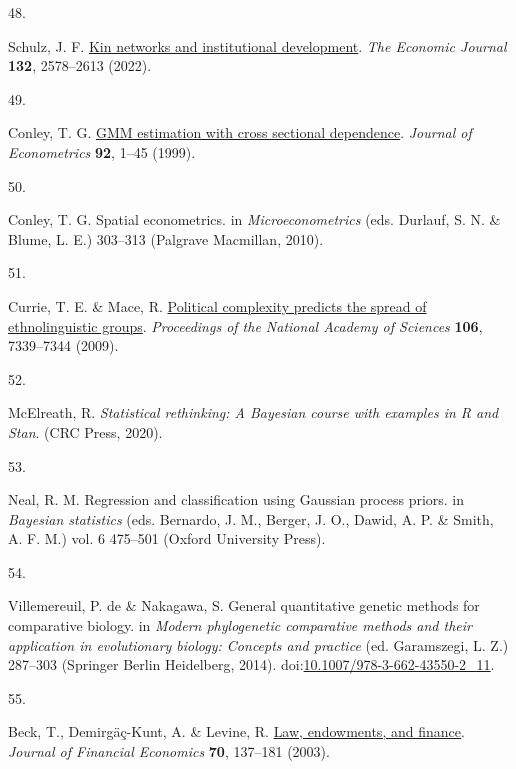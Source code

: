 \documentclass[
  man,floatsintext]{apa6}
\newlength{\cslhangindent}
\newlength{\csllabelwidth}
\newlength{\cslentryspacingunit} %
\newenvironment{CSLReferences}[2] %
 {%
  \setlength{\parindent}{0pt}
  \ifodd #1
  \let\oldpar\par
  \def\par{\hangindent=\cslhangindent\oldpar}
  \fi
  \setlength{\parskip}{#2\cslentryspacingunit}
 }%
 {}
\newcommand{\CSLLeftMargin}[1]{\parbox[t]{\csllabelwidth}{#1}}
\newcommand{\CSLRightInline}[1]{\parbox[t]{\linewidth - \csllabelwidth}{#1}\break}
\begin{document}
\begin{CSLReferences}{0}{0}
\leavevmode{}%
\CSLLeftMargin{48. }%
\CSLRightInline{Schulz, J. F. \href{https://doi.org/10.1093/ej/ueac027}{Kin networks and institutional development}. \emph{The Economic Journal} \textbf{132}, 2578--2613 (2022).}

\leavevmode{}%
\CSLLeftMargin{49. }%
\CSLRightInline{Conley, T. G. \href{https://doi.org/10.1016/S0304-4076(98)00084-0}{{GMM} estimation with cross sectional dependence}. \emph{Journal of Econometrics} \textbf{92}, 1--45 (1999).}

\leavevmode{}%
\CSLLeftMargin{50. }%
\CSLRightInline{Conley, T. G. Spatial econometrics. in \emph{Microeconometrics} (eds. Durlauf, S. N. \& Blume, L. E.) 303--313 (Palgrave Macmillan, 2010).}

\leavevmode{}%
\CSLLeftMargin{51. }%
\CSLRightInline{Currie, T. E. \& Mace, R. \href{https://doi.org/10.1073/pnas.0804698106}{Political complexity predicts the spread of ethnolinguistic groups}. \emph{Proceedings of the National Academy of Sciences} \textbf{106}, 7339--7344 (2009).}

\leavevmode{}%
\CSLLeftMargin{52. }%
\CSLRightInline{McElreath, R. \emph{Statistical rethinking: A {B}ayesian course with examples in {R} and {Stan}}. (CRC Press, 2020).}

\leavevmode{}%
\CSLLeftMargin{53. }%
\CSLRightInline{Neal, R. M. Regression and classification using {Gaussian} process priors. in \emph{Bayesian statistics} (eds. Bernardo, J. M., Berger, J. O., Dawid, A. P. \& Smith, A. F. M.) vol. 6 475--501 (Oxford University Press).}

\leavevmode{}%
\CSLLeftMargin{54. }%
\CSLRightInline{Villemereuil, P. de \& Nakagawa, S. General quantitative genetic methods for comparative biology. in \emph{Modern phylogenetic comparative methods and their application in evolutionary biology: Concepts and practice} (ed. Garamszegi, L. Z.) 287--303 (Springer Berlin Heidelberg, 2014). doi:\href{https://doi.org/10.1007/978-3-662-43550-2_11}{10.1007/978-3-662-43550-2\_11}.}

\leavevmode{}%
\CSLLeftMargin{55. }%
\CSLRightInline{Beck, T., Demirgäç-Kunt, A. \& Levine, R. \href{https://doi.org/10.1016/S0304-405X(03)00144-2}{Law, endowments, and finance}. \emph{Journal of Financial Economics} \textbf{70}, 137--181 (2003).}


\end{CSLReferences}
\end{document}
